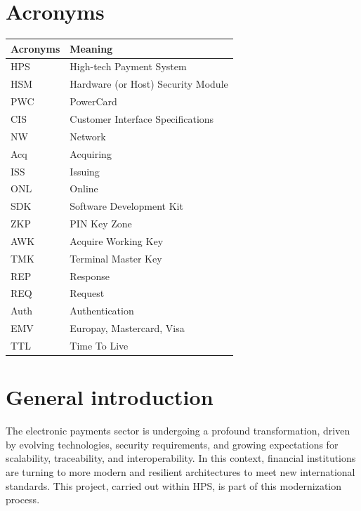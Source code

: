 \documentclass[12pt,a4paper]{report}
\begin{document}
\hypertarget{acronyms}{%
\section*{Acronyms}\label{acronyms}}
\begin{table}[H]
\centering
\renewcommand{\arraystretch}{1.3} %
\begin{tabular}{|p{3cm}|p{10cm}|}
\hline
\textbf{Acronyms} & \textbf{Meaning} \\
\hline
HPS  & High-tech Payment System \\
\hline
HSM  & Hardware (or Host) Security Module \\
\hline
PWC  & PowerCard \\
\hline
CIS  & Customer Interface Specifications \\
\hline
NW   & Network \\
\hline
Acq  & Acquiring \\
\hline
ISS  & Issuing \\
\hline
ONL  & Online \\
\hline
SDK  & Software Development Kit \\
\hline
ZKP  & PIN Key Zone \\
\hline
AWK  & Acquire Working Key \\
\hline
TMK  & Terminal Master Key \\
\hline
REP  & Response \\
\hline
REQ  & Request \\
\hline
Auth & Authentication \\
\hline
EMV  & Europay, Mastercard, Visa \\
\hline
TTL  & Time To Live \\
\hline
\end{tabular}
\end{table}

\clearpage


\tableofcontents
\clearpage


\listoffigures
\clearpage




\section{General introduction}
The electronic payments sector is undergoing a profound transformation,
driven by evolving technologies, security requirements, and growing
expectations for scalability, traceability, and interoperability. In
this context, financial institutions are turning to more modern and
resilient architectures to meet new international standards. This
project, carried out within HPS, is part of this modernization process.
\end{document}
